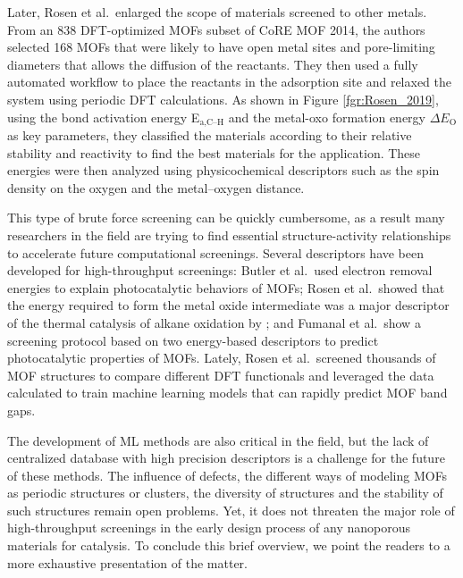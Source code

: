 \documentclass[main.tex]{subfiles}
\begin{document}
Later, Rosen et al.\ enlarged the scope of materials screened to other metals.\cite{Rosen_2019} From an 838 DFT-optimized MOFs subset of CoRE MOF 2014, the authors selected 168 MOFs that were likely to have open metal sites and pore-limiting diameters that allows the diffusion of the reactants. They then used a fully automated workflow to place the reactants in the adsorption site and relaxed the system using periodic DFT calculations. As shown in Figure \ref{fgr:Rosen_2019}, using the bond activation energy E$_\text{a,C--H}$ and the metal-oxo formation energy $\Delta E_\text{O}$ as key parameters, they classified the materials according to their relative stability and reactivity to find the best materials for the application. These energies were then analyzed using physicochemical descriptors such as the spin density on the oxygen and the metal--oxygen distance.

This type of brute force screening can be quickly cumbersome, as a result many researchers in the field are trying to find essential structure-activity relationships to accelerate future computational screenings.
Several descriptors have been developed for high-throughput screenings: Butler et al.\ used electron removal energies to explain photocatalytic behaviors of MOFs;\cite{Butler_2014} Rosen et al.\ showed that the energy required to form the metal oxide intermediate was a major descriptor of the thermal catalysis of alkane oxidation by ;\cite{Rosen_HTPDFT_2019} and Fumanal et al.\ show a screening protocol based on two energy-based descriptors to predict photocatalytic properties of MOFs.\cite{Fumanal_descriptor_2020} {Lately, Rosen et al.\ screened thousands of MOF structures to compare different DFT functionals and leveraged the data calculated to train machine learning models that can rapidly predict MOF band gaps.\cite{Rosen_2022_high} }

The development of ML methods are also critical in the field,\cite{Rosen_2021} but the lack of centralized database with high precision descriptors is a challenge for the future of these methods. The influence of defects, the different ways of modeling MOFs as periodic structures or clusters, the diversity of structures and the stability of such structures remain open problems. Yet, it does not threaten the major role of high-throughput screenings in the early design process of any nanoporous materials for catalysis. To conclude this brief overview, we point the readers to a more exhaustive presentation of the matter.\cite{Rosen_2022}
\end{document}
